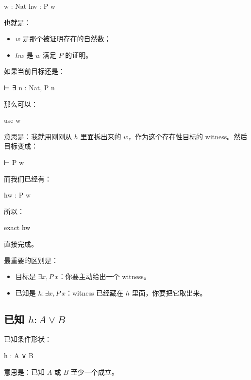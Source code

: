 \documentclass[UTF8,12pt]{ctexart}
\begin{document}
\begin{LeanCode}
w : Nat
hw : P w
\end{LeanCode}

也就是：
\begin{itemize}
  \item \(w\) 是那个被证明存在的自然数；
  \item \(hw\) 是 \(w\) 满足 \(P\) 的证明。
\end{itemize}

如果当前目标还是：

\begin{LeanCode}
⊢ ∃ n : Nat, P n
\end{LeanCode}

那么可以：

\begin{LeanCode}
use w
\end{LeanCode}

意思是：我就用刚刚从 \(h\) 里面拆出来的 \(w\)，作为这个存在性目标的 witness。然后目标变成：

\begin{LeanCode}
⊢ P w
\end{LeanCode}

而我们已经有：

\begin{LeanCode}
hw : P w
\end{LeanCode}

所以：

\begin{LeanCode}
exact hw
\end{LeanCode}

直接完成。

最重要的区别是：
\begin{itemize}
  \item 目标是 \(\exists x, P\ x\)：你要主动给出一个 witness。
  \item 已知是 \(h : \exists x, P\ x\)：witness 已经藏在 \(h\) 里面，你要把它取出来。
\end{itemize}

\subsection{已知 \(h : A \lor B\)}

已知条件形状：

\begin{LeanCode}
h : A ∨ B
\end{LeanCode}

意思是：已知 \(A\) 或 \(B\) 至少一个成立。
\end{document}

